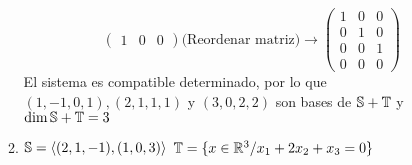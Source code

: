 \documentclass[../practica.root.tex]{subfiles}
\begin{document}
\begin{enumerate}
\begin{enumerate}
\[\begin{pmatrix}
                            1 & 0 & 0
                        \end{pmatrix}
                        \text{(Reordenar matriz)}\to
                        \begin{pmatrix}
                            1 & 0 & 0 \\
                            0 & 1 & 0 \\
                            0 & 0 & 1 \\
                            0 & 0 & 0
                        \end{pmatrix}
                    \]
                    El sistema es compatible determinado, por lo que $(1,-1,0,1),(2,1,1,1)$ y $(3,0,2,2)$ son bases de $\S + \T$ y $\dim\S + \T = 3$

              \item $\S = \langle (2,1,-1),(1,0,3) \rangle$ $\T = \{ x \in \R^3 / x_1 + 2x_2 + x_3 = 0 \}$


\end{enumerate}
\end{enumerate}
\end{document}
